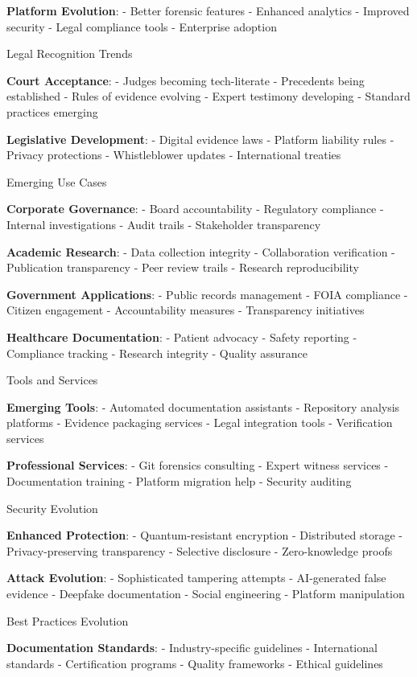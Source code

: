 \textbf{Platform Evolution}: - Better forensic features - Enhanced
analytics - Improved security - Legal compliance tools - Enterprise
adoption

Legal Recognition Trends

\textbf{Court Acceptance}: - Judges becoming tech-literate - Precedents
being established - Rules of evidence evolving - Expert testimony
developing - Standard practices emerging

\textbf{Legislative Development}: - Digital evidence laws - Platform
liability rules - Privacy protections - Whistleblower updates -
International treaties

Emerging Use Cases

\textbf{Corporate Governance}: - Board accountability - Regulatory
compliance - Internal investigations - Audit trails - Stakeholder
transparency

\textbf{Academic Research}: - Data collection integrity - Collaboration
verification - Publication transparency - Peer review trails - Research
reproducibility

\textbf{Government Applications}: - Public records management - FOIA
compliance - Citizen engagement - Accountability measures - Transparency
initiatives

\textbf{Healthcare Documentation}: - Patient advocacy - Safety reporting
- Compliance tracking - Research integrity - Quality assurance

Tools and Services

\textbf{Emerging Tools}: - Automated documentation assistants -
Repository analysis platforms - Evidence packaging services - Legal
integration tools - Verification services

\textbf{Professional Services}: - Git forensics consulting - Expert
witness services - Documentation training - Platform migration help -
Security auditing

Security Evolution

\textbf{Enhanced Protection}: - Quantum-resistant encryption -
Distributed storage - Privacy-preserving transparency - Selective
disclosure - Zero-knowledge proofs

\textbf{Attack Evolution}: - Sophisticated tampering attempts -
AI-generated false evidence - Deepfake documentation - Social
engineering - Platform manipulation

Best Practices Evolution

\textbf{Documentation Standards}: - Industry-specific guidelines -
International standards - Certification programs - Quality frameworks -
Ethical guidelines


